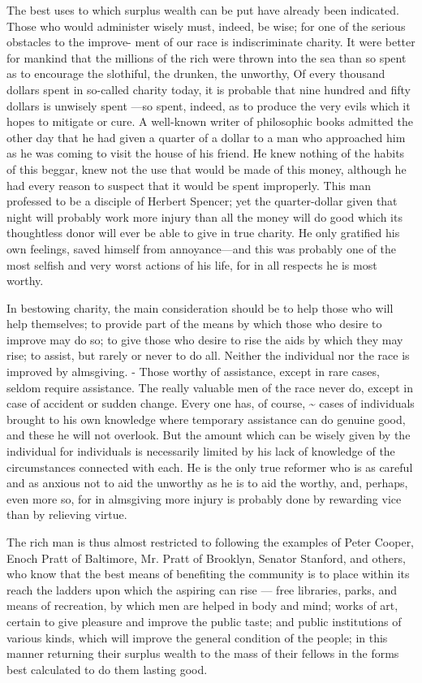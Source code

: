 \documentclass[11pt,openany]{book}
\begin{document}
The best uses to which surplus wealth can be put have already been indicated. Those who would administer wisely must, indeed, be wise; for one of the serious obstacles to the improve- ment of our race is indiscriminate charity. It were better for mankind that the millions of the rich were thrown into the sea than so spent as to encourage the slothiful, the drunken, the unworthy, Of every thousand dollars spent in so-called charity today, it is probable that nine hundred and fifty dollars is unwisely spent ---so spent, indeed, as to produce the very evils which it hopes to mitigate or cure. A well-known writer of philosophic books admitted the other day that he had given a quarter of a dollar to a man who approached him as he was coming to visit the house of his friend. He knew nothing of the habits of this beggar, knew not the use that would be made of this money, although he had every reason to suspect that it would be spent improperly. This man professed to be a disciple of Herbert Spencer; yet the quarter-dollar given that night will probably work more injury than all the money will do good which its thoughtless donor will ever be able to give in true charity. He only gratified his own feelings, saved himself from annoyance---and this was probably one of the most selfish and very worst actions of his life, for in all respects he is most worthy.

In bestowing charity, the main consideration should be to help those who will help themselves; to provide part of the means by which those who desire to improve may do so; to give those who desire to rise the aids by which they may rise; to assist, but rarely or never to do all. Neither the individual nor the race is improved by almsgiving. - Those worthy of assistance, except in rare cases, seldom require assistance. The really valuable men of the race never do, except in case of accident or sudden change. Every one has, of course, \textasciitilde{} cases of individuals brought to his own knowledge where temporary assistance can do genuine good, and these he will not overlook. But the amount which can be wisely given by the individual for individuals is necessarily limited by his lack of knowledge of the circumstances connected with each. He is the only true reformer who is as careful and as anxious not to aid the unworthy as he is to aid the worthy, and, perhaps, even more so, for in almsgiving more injury is probably done by rewarding vice than by relieving virtue.

The rich man is thus almost restricted to following the examples of Peter Cooper, Enoch Pratt of Baltimore, Mr. Pratt of Brooklyn, Senator Stanford, and others, who know that the best means of benefiting the community is to place within its reach the ladders upon which the aspiring can rise --- free libraries, parks, and means of recreation, by which men are helped in body and mind; works of art, certain to give pleasure and improve the public taste; and public institutions of various kinds, which will improve the general condition of the people; in this manner returning their surplus wealth to the mass of their fellows in the forms best calculated to do them lasting good.
\end{document}
